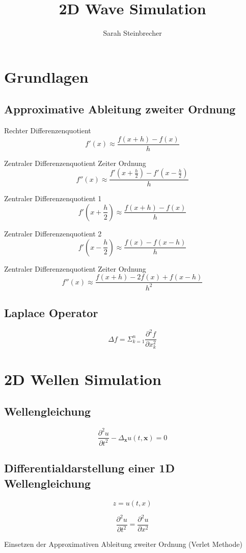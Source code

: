 \documentclass[10pt,a4paper]{article}
\author{Sarah Steinbrecher}
\title{2D Wave Simulation}
\begin{document}
\section{Grundlagen}

\subsection{Approximative Ableitung zweiter Ordnung}

Rechter Differenzenquotient
\[ f'(x) \approx \frac{ f(x + h) - f(x) }{ h }  \]

Zentraler Differenzenquotient Zeiter Ordnung
\[ f''(x) \approx \frac{ f'( x + \frac{h}{2} ) - f'( x - \frac{h}{2} ) } { h }   \]

Zentraler Differenzenquotient 1
\[ f'( x + \frac{h}{2} ) \approx \frac{ f( x + h ) - f( x ) } { h }   \]

Zentraler Differenzenquotient 2
\[ f'( x - \frac{h}{2} ) \approx \frac{ f( x ) - f( x - h ) } { h }   \]

Zentraler Differenzenquotient Zeiter Ordnung
\[ f''(x) \approx \frac{ f( x + h ) - 2f(x) +  f( x - h )} { h^2 }   \]

\subsection{Laplace Operator}

\[ \Delta f = \Sigma^{n}_{k=1} \frac{\partial^2 f}{\partial x_k^2}   \]


\section{2D Wellen Simulation}

\subsection{Wellengleichung}

\[ \frac{\partial^2 u}{\partial t^2} -  \Delta_\mathbf{x} u(t, \mathbf{x}) = 0 \]

\subsection{Differentialdarstellung einer 1D Wellengleichung}

\[ z = u(t, x) \]

\[ \frac{\partial^2 u}{\partial t^2} = \frac{\partial^2 u}{\partial x^2} \]

Einsetzen der Approximativen Ableitung zweiter Ordnung (Verlet Methode)
\end{document}
